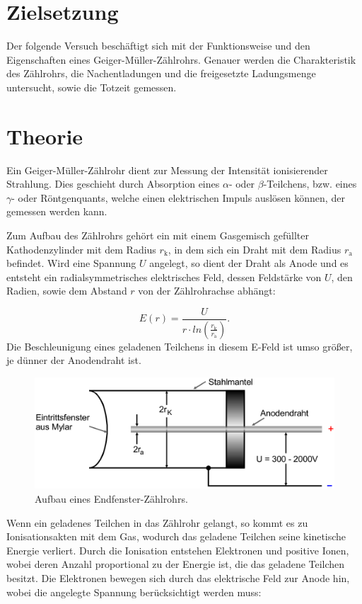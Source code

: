 \section{Zielsetzung}
Der folgende Versuch beschäftigt sich mit der Funktionsweise und den Eigenschaften eines Geiger-Müller-Zählrohrs. Genauer werden die Charakteristik des Zählrohrs, die Nachentladungen und die freigesetzte Ladungsmenge untersucht, sowie die Totzeit gemessen.

\section{Theorie}
Ein Geiger-Müller-Zählrohr dient zur Messung der Intensität ionisierender Strahlung. Dies geschieht durch Absorption eines $\alpha$- oder $\beta$-Teilchens, bzw. eines $\gamma$- oder Röntgenquants, welche einen elektrischen Impuls auslösen können, der gemessen
werden kann.

Zum Aufbau des Zählrohrs gehört ein mit einem Gasgemisch gefüllter Kathodenzylinder mit dem Radius $r_{\text{k}}$, in dem sich ein Draht mit dem Radius $r_{\text{a}}$ befindet. Wird eine Spannung $U$ angelegt, so dient der Draht als Anode und es entsteht ein
radialsymmetrisches elektrisches Feld, dessen Feldstärke von $U$, den Radien, sowie dem Abstand $r$ von der Zählrohrachse abhängt:

\begin{equation}
E(r) = \frac{U}{r\cdot ln(\frac{r_{\text{k}}}{r_{\text{a}}})}.
\end{equation}
Die Beschleunigung eines geladenen Teilchens in diesem E-Feld ist umso größer, je dünner der Anodendraht ist.

\begin{figure}[h!tbp]
	\centering
	\includegraphics[width=0.9\linewidth]{aufbaurohr.png}
	\caption{Aufbau eines Endfenster-Zählrohrs. \cite[1]{anleitung703}}
	\label{fig:aufbaurohr}
\end{figure}
Wenn ein geladenes Teilchen in das Zählrohr gelangt, so kommt es zu Ionisationsakten mit dem Gas, wodurch das geladene Teilchen seine kinetische Energie verliert. Durch die Ionisation entstehen Elektronen und positive Ionen, wobei deren Anzahl proportional
zu der Energie ist, die das geladene Teilchen besitzt. Die Elektronen bewegen sich durch das elektrische Feld zur Anode hin, wobei die angelegte Spannung berücksichtigt werden muss:


